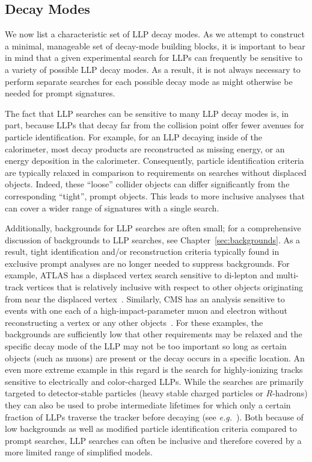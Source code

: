 \subsection{Decay Modes}\label{sec:decmodes}

We now list a characteristic set of LLP decay modes.
As we attempt to construct a minimal, manageable set of decay-mode building blocks, it is important to bear in mind that a given experimental search for LLPs can frequently be sensitive to a variety of possible LLP decay modes.
As a result, it is not always necessary to perform separate searches for each possible decay mode as might otherwise be needed for prompt signatures.

The fact that LLP searches can be sensitive to many LLP decay modes is, in part, because LLPs that decay far from the collision point offer fewer avenues for particle identification.
For example, for an LLP decaying inside of the calorimeter, most decay products are reconstructed as missing energy, or an energy deposition in the calorimeter.
Consequently, particle identification criteria are typically relaxed in comparison to requirements on searches without displaced objects.
Indeed, these ``loose'' collider objects can differ significantly from the corresponding ``tight'', prompt objects.
This leads to more inclusive analyses that can cover a wider range of signatures with a single search.

Additionally, backgrounds for LLP searches are often small; for a comprehensive discussion of backgrounds to LLP searches, see Chapter~\ref{sec:backgrounds}.
As a result, tight identification and/or reconstruction criteria typically found in exclusive prompt analyses are  no longer needed to suppress backgrounds.
For example, ATLAS has a displaced vertex search sensitive to di-lepton and multi-track vertices that is relatively inclusive with respect to other objects originating from near the displaced vertex~\cite{Aad:2015rba}.
Similarly, CMS has an analysis sensitive to events with one each of a high-impact-parameter muon and electron without reconstructing a vertex or any other objects~\cite{CMS-PAS-EXO-16-022}.
For these examples, the backgrounds are sufficiently low that other requirements may be relaxed and the specific decay mode of the LLP may not be too important so long as certain objects (such as muons) are present or the decay occurs in a specific location.
An even more extreme example in this regard is the search for highly-ionizing tracks sensitive to electrically and color-charged LLPs.
While the searches are primarily targeted to detector-stable particles (heavy stable charged particles or $R$-hadrons) they can also be used to probe intermediate lifetimes for which only a certain fraction of LLPs traverse the tracker before decaying (see \emph{e.g.}~\cite{Garny:2017rxs}).
Both because of low backgrounds as well as modified particle identification criteria compared to prompt searches, LLP searches can often be inclusive and therefore covered by a more limited range of simplified models.

